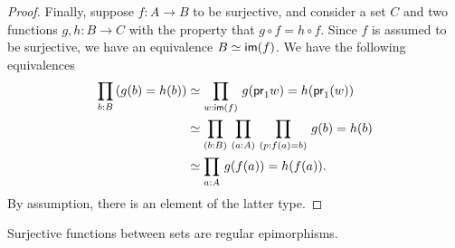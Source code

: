 \begin{proof}
Finally, suppose $f:A\to B$ to be surjective, and consider a set $C$ and two functions
$g,h:B\to C$ with the property that $g\circ f = h\circ f$. Since $f$ 
is assumed to be surjective,
we have an equivalence $B\simeq\mathsf{im}(f)$. We have the following equivalences
\begin{align*}
\prd{b:B} (g(b)= h(b))
& \simeq \prd{w:\im(f)} g(\proj1 w)= h(\proj1(w))\\
& \simeq \prd{b:B}{a:A}{p:f(a)= b} g(b)= h(b)\\
& \simeq \prd{a:A} g(f(a))= h(f(a)).
\end{align*}
By assumption, there is an element of the latter type.
\end{proof}


\begin{lem}\label{lem:images_are_coequalizers}
Surjective functions between sets are regular epimorphisms.
\end{lem}

